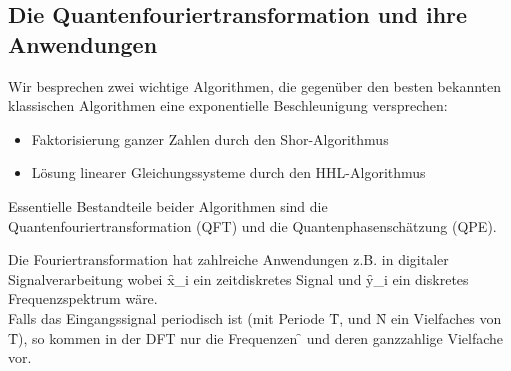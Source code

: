 \subsection{Die Quantenfouriertransformation und ihre Anwendungen}
Wir besprechen zwei wichtige Algorithmen, die gegenüber den besten bekannten klassischen Algorithmen eine exponentielle Beschleunigung versprechen:
\begin{itemize}
    \item Faktorisierung ganzer Zahlen durch den Shor-Algorithmus
    \item Lösung linearer Gleichungssysteme durch den HHL-Algorithmus
\end{itemize}
Essentielle Bestandteile beider Algorithmen sind die Quantenfouriertransformation (QFT) und die Quantenphasenschätzung (QPE).

Die Fouriertransformation hat zahlreiche Anwendungen z.B. in digitaler Signalverarbeitung wobei \f{x_i} ein zeitdiskretes Signal und \f{y_i} ein diskretes Frequenzspektrum wäre.\\

Falls das Eingangssignal periodisch ist (mit Periode \f{T}, und \f{N} ein Vielfaches von \f{T}), so kommen in der DFT nur die Frequenzen \f{} und deren ganzzahlige Vielfache vor.

